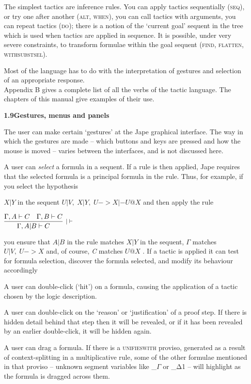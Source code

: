 \documentclass[11pt]{book}
\newcommand{\tab}{\hspace{5mm}}
\newcommand{\reason}[1]{\scalebox{0.85}{#1}}
\begin{document}
The simplest tactics are inference rules. You can apply tactics sequentially (\textsc{seq}), or try one after another (\textsc{alt, when}), you can call tactics with arguments, you can repeat tactics (\textsc{do}); there is a notion of the `current goal' sequent in the tree which is used when tactics are applied in sequence. It is possible, under very severe constraints, to transform formulae within the goal sequent (\textsc{find, flatten, withsubstsel}).


Most of the language has to do with the interpretation of gestures and selection of an appropriate response.\\
Appendix B gives a complete list of all the verbs of the tactic language. The chapters of this manual give examples of their use.


\textbf{{\large 1.9\tab Gestures, menus and panels}}


The user can make certain `gestures' at the Jape graphical interface. The way in which the gestures are made -- which buttons and keys are pressed and how the mouse is moved -- varies between the interfaces, and is not discussed here.


{\textbullet}\tab A user can \textit{select} a formula in a sequent. If a rule is then applied, Jape requires that the selected formula is a principal formula in the rule. Thus, for example, if you select the hypothesis

$X|Y$ in the sequent $U|V,\;X|Y,\;U->X |- U@X$ and then apply the rule


$\infer[\reason{$| |- $}]
       {\Gamma,A|B |- C}
       {\Gamma,A |- C\quad \Gamma,B |- C}$

\tab you ensure that $A|B$ in the rule matches $X|Y$ in the sequent, \ensuremath{\Gamma} matches $U|V,\;U->X$ and, of course, \textit{C} matches $U@X$ . If a tactic is applied it can test for formula selection, discover the formula selected, and modify its behaviour accordingly


{\textbullet}\tab A user can double-click (`hit') on a formula, causing the application of a tactic chosen by the logic description.


{\textbullet}\tab A user can double-click on the `reason' or `justification' of a proof step. If there is hidden detail behind that step then it will be revealed, or if it has been revealed by an earlier double-click, it will be hidden again.


{\textbullet}\tab A user can drag a formula. If there is a \textsc{unifieswith} proviso, generated as a result of context-splitting in a multiplicative rule, some of the other formulae mentioned in that proviso -- unknown segment variables like \_\ensuremath{\Gamma} or \_Δ1 -- will highlight as the formula is dragged across them.
\end{document}
